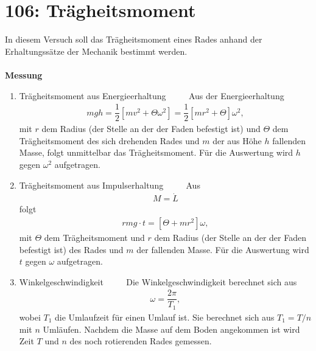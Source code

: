 \newpage
\section{106: Trägheitsmoment}
In diesem Versuch soll das Trägheitsmoment eines Rades anhand der Erhaltungssätze der Mechanik bestimmt werden.\\\\
\textbf{Messung} 
\begin{enumerate}[label=--]
        \item Trägheitsmoment aus Energieerhaltung $\qquad $ 
                Aus der Energieerhaltung
                \begin{align} 
                        mgh=\dfrac{1}{2}\left[mv^2+\Theta \omega ^2\right]=\dfrac{1}{2}\left[mr^2+\Theta \right]\omega ^2
                ,\end{align} 
                mit $r$ dem Radius (der Stelle an der der Faden befestigt ist) und $\Theta $ dem Trägheitsmoment des sich drehenden Rades und $m$ der aus Höhe $h$ fallenden Masse, folgt unmittelbar das Trägheitsmoment.
                Für die Auswertung wird $h$ gegen $\omega ^2$ aufgetragen.
        \item Trägheitsmoment aus Impulserhaltung $\qquad $ 
                Aus
                \begin{align} 
                        M=\dot{L}
                \end{align} 
                folgt
                \begin{align} 
                        rmg\cdot t = \left[\Theta +mr^2\right]\omega 
                ,\end{align} 
                mit $\Theta $ dem Trägheitsmoment und $r$ dem Radius (der Stelle an der der Faden befestigt ist) des Rades und $m$ der fallenden Masse.
                Für die Auswertung wird $t$ gegen $\omega $ aufgetragen.
        \item Winkelgeschwindigkeit $\qquad $ 
                Die Winkelgeschwindigkeit berechnet sich aus
                \begin{align} 
                        \omega =\dfrac{2\pi }{T_1}
                ,\end{align} 
                wobei $T_1$ die Umlaufzeit für einen Umlauf ist. 
                Sie berechnet sich aus $T_1=T/n$ mit $n$ Umläufen. 
                Nachdem die Masse auf dem Boden angekommen ist wird Zeit $T$ und $n$ des noch rotierenden Rades gemessen.
\end{enumerate}

